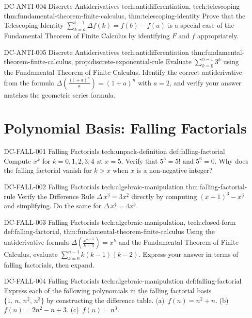 \exstubgenfull
  {DC-ANTI-004}
  {Discrete Antiderivatives}
  {tech:antidifferentiation, tech:telescoping}
  {thm:fundamental-theorem-finite-calculus, thm:telescoping-identity}
  {Prove that the Telescoping Identity
  \(\displaystyle\sum_{k=a}^{b-1}\Delta f(k) = f(b) - f(a)\)
  is a special case of the Fundamental Theorem of Finite Calculus by
  identifying \(F\) and \(f\) appropriately.}

\exstubgenfull
  {DC-ANTI-005}
  {Discrete Antiderivatives}
  {tech:antidifferentiation}
  {thm:fundamental-theorem-finite-calculus, prop:discrete-exponential-rule}
  {Evaluate \(\displaystyle\sum_{k=0}^{n-1} 3^k\) using the Fundamental
  Theorem of Finite Calculus. Identify the correct antiderivative from
  the formula \(\Delta\!\left(\tfrac{(1+a)^n}{a}\right) = (1+a)^n\) with
  \(a = 2\), and verify your answer matches the geometric series formula.}

\section*{Polynomial Basis: Falling Factorials}

\exstubgenfull
  {DC-FALL-001}
  {Falling Factorials}
  {tech:unpack-definition}
  {def:falling-factorial}
  {Compute \(x^{\underline{k}}\) for \(k = 0, 1, 2, 3, 4\) at \(x = 5\).
  Verify that \(5^{\underline{5}} = 5!\) and \(5^{\underline{6}} = 0\).
  Why does the falling factorial vanish for \(k > x\) when \(x\) is a
  non-negative integer?}

\exstubgenfull
  {DC-FALL-002}
  {Falling Factorials}
  {tech:algebraic-manipulation}
  {thm:falling-factorial-rule}
  {Verify the Difference Rule \(\Delta\,x^{\underline{3}} = 3x^{\underline{2}}\)
  directly by computing \((x+1)^{\underline{3}} - x^{\underline{3}}\) and
  simplifying. Do the same for \(\Delta\,x^{\underline{4}} = 4x^{\underline{3}}\).}

\exstubgenfull
  {DC-FALL-003}
  {Falling Factorials}
  {tech:algebraic-manipulation, tech:closed-form}
  {def:falling-factorial, thm:fundamental-theorem-finite-calculus}
  {Using the antiderivative formula \(\Delta\!\left(\tfrac{x^{\underline{k+1}}}{k+1}\right) = x^{\underline{k}}\)
  and the Fundamental Theorem of Finite Calculus, evaluate
  \(\displaystyle\sum_{k=0}^{n-1} k(k-1)(k-2)\).
  Express your answer in terms of falling factorials, then expand.}

\exstubgenfull
  {DC-FALL-004}
  {Falling Factorials}
  {tech:algebraic-manipulation}
  {def:falling-factorial}
  {Express each of the following polynomials in the falling factorial basis
  \(\{1,\, n,\, n^{\underline{2}},\, n^{\underline{3}}\}\) by constructing
  the difference table.
  (a)~\(f(n) = n^2 + n\).
  (b)~\(f(n) = 2n^2 - n + 3\).
  (c)~\(f(n) = n^3\).}

